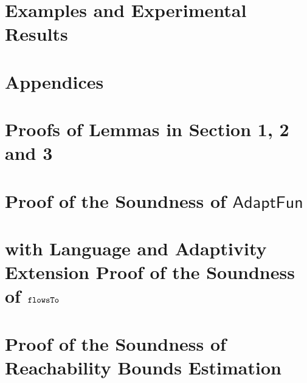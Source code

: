 \documentclass[a4paper,11pt]{article}
\newcommand{\highlight}[1]{\textcolor[rgb]{.0,0.0,1.0}{ #1}}
\newcommand{\THESYSTEM}{\textsf{AdaptFun}}
\begin{document}
\section{Examples and Experimental Results}


%
\clearpage
\appendix
{}
\section*{Appendices}
\section{Proofs of Lemmas in Section 1, 2 and 3 }
\label{apdx:lemma_sec123}

\section{Proof of the Soundness of $\THESYSTEM$}
\label{apdx:adapt_soundness}

\clearpage
\section{\highlight{with Language and Adaptivity Extension} Proof of the Soundness of $\mathtt{flowsTo}$}
\label{apdx:flowsto_soundness_extend}

\clearpage
% 
% 
% 
% 
\section{Proof of the Soundness of Reachability Bounds Estimation}
\label{apdx:reachability_soundness}

\clearpage
% 
\end{document}
